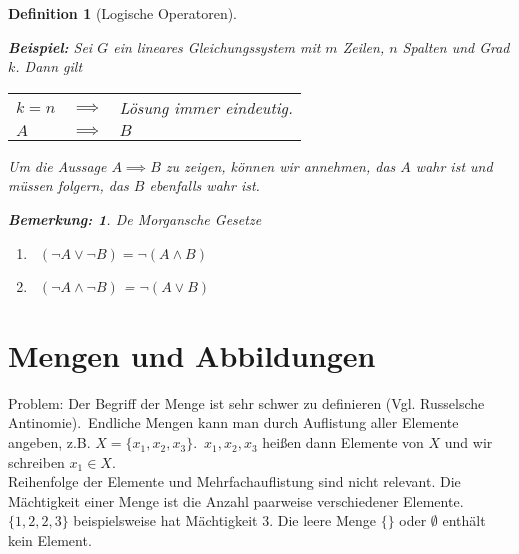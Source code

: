 \documentclass{report}
\newcommand{\IN}[1]{\index{#1|BH}}
\theoremstyle{customrem}
\newtheorem*{bemerkung}{Bemerkung\textnormal:}
\theoremstyle{customdef}
\newtheorem{definition}{Definition}[chapter]
\theoremstyle{customenv}
\begin{document}
\begin{definition}[Logische Operatoren]
\begin{enumerate}
		\end{enumerate}
		\textbf{Beispiel:} Sei \(G\) ein lineares Gleichungssystem mit \(m\) Zeilen, \(n\) Spalten und Grad \(k\). Dann gilt
		\begin{center}
			\begin{tabular}{l c l}
				\(k = n\) & \(\implies\) & Lösung immer eindeutig.\\
				\(A\) & \(\implies\) &  \(B\)\\
			\end{tabular}
		\end{center}
		Um die Aussage \(A \implies B\) zu zeigen, können wir annehmen, das \(A\) wahr ist und müssen folgern, das \(B\) ebenfalls wahr ist.\\
		\begin{bemerkung} De Morgansche Gesetze
			\begin{enumerate}
				\item\ \((\neg A \lor \neg B) = \neg (A \land B)\)
				\item\ \((\neg A \land \neg B)\) = \(\neg (A \lor B)\)
			\end{enumerate}
		\end{bemerkung}
	\end{definition}
	
	
	\section{Mengen und Abbildungen}
	\IN{Menge}
	Problem: Der Begriff der Menge ist sehr schwer zu definieren (Vgl. Russelsche Antinomie).\
	Endliche Mengen kann man durch Auflistung aller Elemente angeben, z.B. \(X = \{x_1, x_2, x_3\}\).\ \(x_1, x_2, x_3\) heißen dann Elemente von \(X\) und wir schreiben \(x_1 \in X\).\\
	
	Reihenfolge der Elemente und Mehrfachauflistung sind nicht relevant. Die Mächtigkeit einer Menge ist die Anzahl paarweise verschiedener Elemente. \(\{1, 2, 2, 3\}\) beispielsweise hat Mächtigkeit \(3\).
	Die leere Menge \(\{\}\) oder \(\emptyset\) enthält kein Element.
	
\end{document}
